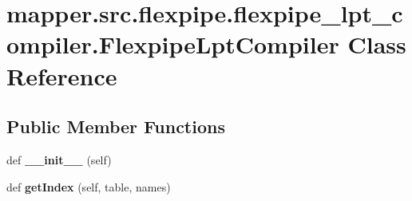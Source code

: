 \hypertarget{classmapper_1_1src_1_1flexpipe_1_1flexpipe__lpt__compiler_1_1_flexpipe_lpt_compiler}{}\section{mapper.\+src.\+flexpipe.\+flexpipe\+\_\+lpt\+\_\+compiler.\+Flexpipe\+Lpt\+Compiler Class Reference}
\label{classmapper_1_1src_1_1flexpipe_1_1flexpipe__lpt__compiler_1_1_flexpipe_lpt_compiler}
\subsection*{Public Member Functions}
\begin{DoxyCompactItemize}
\item 
\hypertarget{classmapper_1_1src_1_1flexpipe_1_1flexpipe__lpt__compiler_1_1_flexpipe_lpt_compiler_ac90ec9079344cf1b3763470e0e7f2b0d}{}def {\bfseries \+\_\+\+\_\+init\+\_\+\+\_\+} (self)\label{classmapper_1_1src_1_1flexpipe_1_1flexpipe__lpt__compiler_1_1_flexpipe_lpt_compiler_ac90ec9079344cf1b3763470e0e7f2b0d}

\item 
\hypertarget{classmapper_1_1src_1_1flexpipe_1_1flexpipe__lpt__compiler_1_1_flexpipe_lpt_compiler_aabb57ef6a9ed75e5760b7d940f7f07d3}{}def {\bfseries get\+Index} (self, table, names)\label{classmapper_1_1src_1_1flexpipe_1_1flexpipe__lpt__compiler_1_1_flexpipe_lpt_compiler_aabb57ef6a9ed75e5760b7d940f7f07d3}


\end{DoxyCompactItemize}

